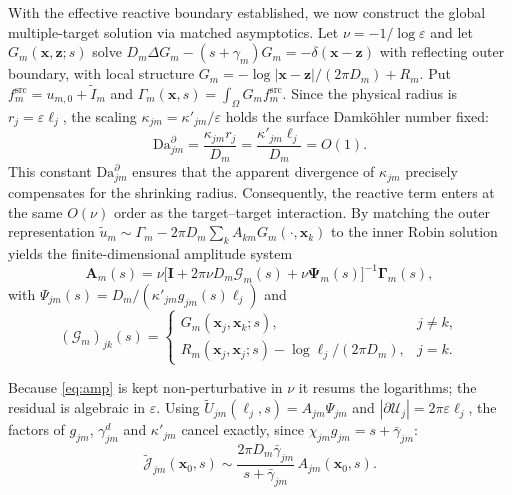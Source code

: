 \documentclass[pdflatex,sn-mathphys-num]{sn-jnl}
\numberwithin{equation}{section}
\theoremstyle{thmstyleone}%
\theoremstyle{definition}
\theoremstyle{remark}
\begin{document}
With the effective reactive boundary established, we now construct the global multiple-target solution via matched asymptotics. Let $\nu=-1/\log\varepsilon$ and let $G_m(\mathbf x,\mathbf z;s)$ solve $D_m\Delta G_m-(s+\gamma_m)G_m=-\delta(\mathbf x-\mathbf z)$ with reflecting outer boundary, with local structure $G_m=-\log|\mathbf x-\mathbf z|/(2\pi D_m)+R_m$. Put $f_m^{\mathrm{src}}=u_{m,0}+\widetilde I_m$ and $\Gamma_m(\mathbf x,s)=\int_\Omega G_mf_m^{\mathrm{src}}$. Since the physical radius is $r_j=\varepsilon\ell_j$, the scaling $\kappa_{jm}=\kappa'_{jm}/\varepsilon$ holds the surface Damk\"ohler number fixed: \begin{equation} \mathrm{Da}^\partial_{jm}=\frac{\kappa_{jm}r_j}{D_m} =\frac{\kappa'_{jm}\ell_j}{D_m}=O(1). \label{eq:damkohler} 
\end{equation} 
This constant $\mathrm{Da}^\partial_{jm}$ ensures that the apparent divergence of $\kappa_{jm}$ precisely compensates for the shrinking radius. Consequently, the reactive term enters at the same $O(\nu)$ order as the target--target interaction. By matching the outer representation $\widetilde u_m\sim\Gamma_m-2\pi D_m\sum_kA_{km}G_m(\cdot,\mathbf x_k)$ to the inner Robin solution yields the finite-dimensional amplitude system
\begin{equation}
\mathbf A_m(s)=\nu\bigl[\mathbf I+2\pi\nu D_m\bm{\mathcal G}_m(s)
+\nu\bm\Psi_m(s)\bigr]^{-1}\bm\Gamma_m(s),
\label{eq:amp}
\end{equation}
with $\Psi_{jm}(s)=D_m/(\kappa'_{jm}g_{jm}(s)\ell_j)$ and
\begin{equation}
(\bm{\mathcal G}_m)_{jk}(s)=
\begin{cases} G_m(\mathbf x_j,\mathbf x_k;s),& j\neq k,\\
R_m(\mathbf x_j,\mathbf x_j;s)-\log\ell_j/(2\pi D_m),& j=k.\end{cases}
\label{eq:gmat}
\end{equation}

Because \eqref{eq:amp} is kept non-perturbative in $\nu$ it resums the
logarithms; the residual is algebraic in $\varepsilon$. Using
$\widetilde U_{jm}(\ell_j,s)=A_{jm}\Psi_{jm}$ and
$|\partial\mathcal U_j|=2\pi\varepsilon\ell_j$, the factors of $g_{jm}$,
$\gamma^d_{jm}$ and $\kappa'_{jm}$ cancel exactly, since
$\chi_{jm}g_{jm}=s+\bar\gamma_{jm}$:
\begin{equation}
\widetilde{\mathcal J}_{jm}(\mathbf x_0,s)\sim
\frac{2\pi D_m\bar\gamma_{jm}}{s+\bar\gamma_{jm}}\,A_{jm}(\mathbf x_0,s).
\label{eq:fluxred}
\end{equation}
\end{document}

